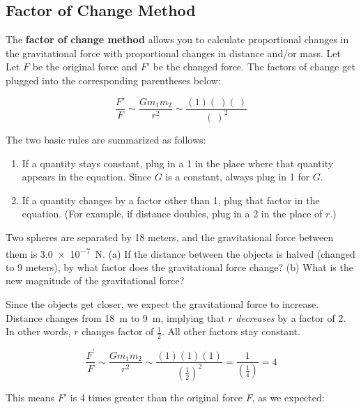 \documentclass[main.tex]{subfiles}
\begin{document}
\subsection{Factor of Change Method}

The \textbf{factor of change method} allows you to calculate proportional changes in the gravitational force with proportional changes in distance and/or mass. Let Let $F$ be the original force and $F'$ be the changed force. The factors of change get plugged into the corresponding parentheses below:

\begin{equation*}
    \frac{F'}{F} \sim \frac{G m_1 m_2}{r^2} \sim \frac{(1)(\ )(\ )}{(\ )^2}
\end{equation*}

The two basic rules are summarized as follows:

\begin{enumerate}
\setlength\itemsep{0ex}
    \item If a quantity stays constant, plug in a 1 in the place where that quantity appears in the equation. Since $G$ is a constant, always plug in 1 for $G$.
    \item If a quantity changes by a factor other than 1, plug that factor in the equation. (For example, if distance doubles, plug in a 2 in the place of $r$.)
\end{enumerate}



\begin{example} \label{ex5bd1}
Two spheres are separated by 18 meters, and the gravitational force between them is \SI{3.0e-7}{N}. (a) If the distance between the objects is halved (changed to 9 meters), by what factor does the gravitational force change? (b) What is the new magnitude of the gravitational force?
\end{example}

\Solution Since the objects get closer, we expect the gravitational force to increase. Distance changes from \SI{18}{m} to \SI{9}{m}, implying that $r$ \textit{decreases} by a factor of 2. In other words, $r$ changes factor of $\frac{1}{2}$. All other factors stay constant. 

\begin{equation*}
    \frac{F^{\prime}}{F} \sim \frac{G m_1 m_2}{r^2} \sim \frac{(1)(1)(1)}{\left(\frac{1}{2}\right)^2} = \frac{1}{\left(\frac{1}{4}\right)} = 4
\end{equation*}

This means $F'$ is 4 times greater than the original force $F$, as we expected:
\end{document}
